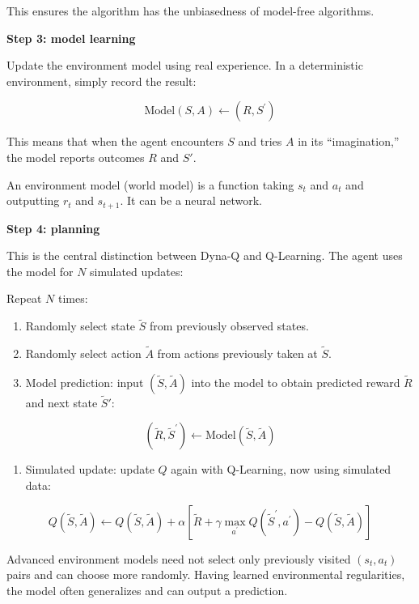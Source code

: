 This ensures the algorithm has the unbiasedness of model-free algorithms.

\textbf{Step 3: model learning}

Update the environment model using real experience. In a deterministic environment, simply record the result:

\[
\mathrm{Model}(S,A)\leftarrow(R,S^{\prime})
\]

This means that when the agent encounters \(S\) and tries \(A\) in its ``imagination,'' the model reports outcomes \(R\) and \(S'\).

An environment model (world model) is a function taking \(s_t\) and \(a_t\) and outputting \(r_t\) and \(s_{t+1}\). It can be a neural network.

\textbf{Step 4: planning}

This is the central distinction between Dyna-Q and Q-Learning. The agent uses the model for \(N\) simulated updates:

Repeat \(N\) times:

\begin{enumerate}
\def\labelenumi{\arabic{enumi}.}
\tightlist
\item
  Randomly select state \(\tilde{S}\) from previously observed states.
\item
  Randomly select action \(\tilde{A}\) from actions previously taken at \(\tilde{S}\).
\item
{}
  Model prediction: input \((\tilde{S},\tilde{A})\) into the model to obtain predicted reward \(\tilde{R}\) and next state \(\tilde{S}'\):
\end{enumerate}

\[
(\tilde{R},\tilde{S}^{\prime})\leftarrow \mathrm{Model}(\tilde{S},\tilde{A})
\]

\begin{enumerate}
\def\labelenumi{\arabic{enumi}.}
\setcounter{enumi}{3}
\tightlist
\item
{}
  Simulated update: update \(Q\) again with Q-Learning, now using simulated data:
\end{enumerate}

\[
Q(\tilde{S},\tilde{A})\leftarrow Q(\tilde{S},\tilde{A})+\alpha[\tilde{R}+\gamma\max_{a^{\prime}}Q(\tilde{S}^{\prime},a^{\prime})-Q(\tilde{S},\tilde{A})]
\]

Advanced environment models need not select only previously visited \((s_t,a_t)\) pairs and can choose more randomly. Having learned environmental regularities, the model often generalizes and can output a prediction.

